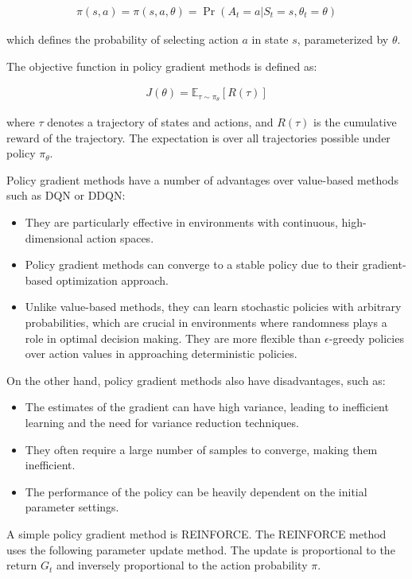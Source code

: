 \begin{align*}
\pi(s, a) = \pi(s, a, \theta) = \Pr(A_t = a | S_t = s, \theta_t = \theta)
\end{align*}

which defines the probability of selecting action $a$ in state $s$, parameterized by $\theta$. 

The objective function in policy gradient methods is defined as:

\begin{align*}
J(\theta) = \mathbb{E}_{\tau \sim \pi_\theta} \left[ R(\tau) \right]
\end{align*}

where $\tau$ denotes a trajectory of states and actions, and $R(\tau)$ is the cumulative reward of the trajectory. The expectation is over all trajectories possible under policy $\pi_\theta$.

Policy gradient methods have a number of advantages over value-based methods such as DQN or DDQN:
\begin{itemize}
\item They are particularly effective in environments with continuous, high-dimensional action spaces.
\item Policy gradient methods can converge to a stable policy due to their gradient-based optimization approach.
\item Unlike value-based methods, they can learn stochastic policies with arbitrary probabilities, which are crucial in environments where randomness plays a role in optimal decision making. They are more flexible than $\epsilon$-greedy policies over action values in approaching deterministic policies.
\end{itemize}

On the other hand, policy gradient methods also have disadvantages, such as:
\begin{itemize}
\item The estimates of the gradient can have high variance, leading to inefficient learning and the need for variance reduction techniques.
\item They often require a large number of samples to converge, making them inefficient.
\item The performance of the policy can be heavily dependent on the initial parameter settings.
\end{itemize}

A simple policy gradient method is REINFORCE. The REINFORCE method uses the following parameter update method. The update is proportional to the return $G_t$ and inversely proportional to the action probability $\pi$. 

